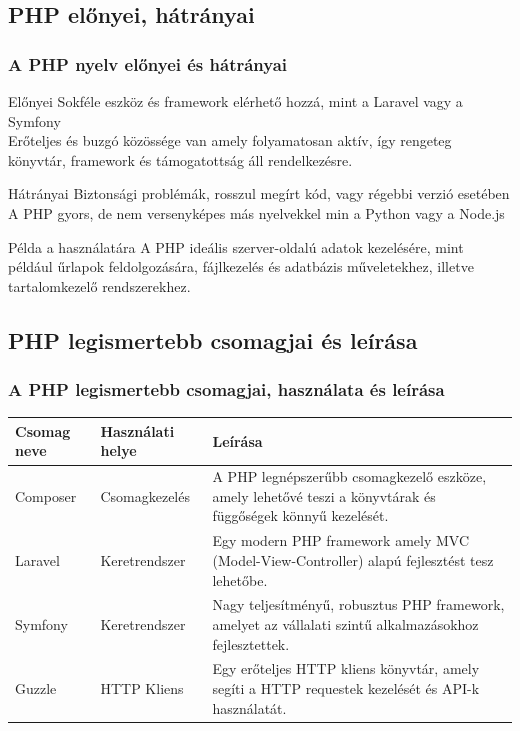 \documentclass[10pt]{beamer}
\begin{document}
	\subsection{PHP előnyei, hátrányai}
	\begin{frame}
		\frametitle{A PHP nyelv előnyei és hátrányai}

		\begin{block}{Előnyei}
			Sokféle eszköz és framework elérhető hozzá, mint a Laravel vagy a Symfony
			\\ Erőteljes és buzgó közössége van amely folyamatosan aktív, így rengeteg
			könyvtár, framework és támogatottság áll rendelkezésre.
		\end{block}
		\begin{alertblock}{Hátrányai}
			Biztonsági problémák, rosszul megírt kód, vagy régebbi verzió esetében \\ A
			PHP gyors, de nem versenyképes más nyelvekkel min a Python vagy a Node.js
		\end{alertblock}
		\begin{exampleblock}{Példa a használatára}
			A PHP ideális szerver-oldalú adatok kezelésére, mint például űrlapok
			feldolgozására, fájlkezelés és adatbázis műveletekhez, illetve
			tartalomkezelő rendszerekhez.
		\end{exampleblock}
	\end{frame}

	\subsection{PHP legismertebb csomagjai és leírása}
	\begin{frame}
		\frametitle{A PHP legismertebb csomagjai, használata és leírása}

		\begin{tabular}{|l|l|>{\raggedright\arraybackslash}m{6.4cm}|}
			\hline
			Csomag neve & Használati helye & Leírása                                                                                                     \\
			\hline
			Composer    & Csomagkezelés    & A PHP legnépszerűbb csomagkezelő eszköze, amely lehetővé teszi a könyvtárak és függőségek könnyű kezelését. \\
			\hline
			Laravel     & Keretrendszer    & Egy modern PHP framework amely MVC (Model-View-Controller) alapú fejlesztést tesz lehetőbe.                 \\
			\hline
			Symfony     & Keretrendszer    & Nagy teljesítményű, robusztus PHP framework, amelyet az vállalati szintű alkalmazásokhoz fejlesztettek.     \\
			\hline
			Guzzle      & HTTP Kliens      & Egy erőteljes HTTP kliens könyvtár, amely segíti a HTTP requestek kezelését és API-k használatát.           \\
			\hline
		\end{tabular}
	\end{frame}
\end{document}
